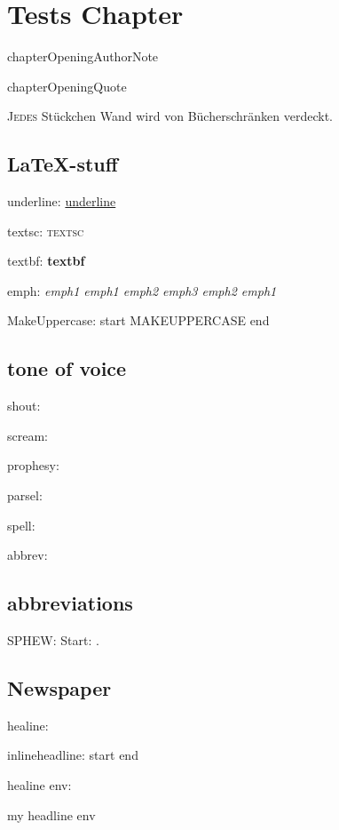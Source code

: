 \chapter{Tests Chapter}

\begin{chapterOpeningAuthorNote}
chapterOpeningAuthorNote
\end{chapterOpeningAuthorNote}
\begin{chapterOpeningQuote}
chapterOpeningQuote
\end{chapterOpeningQuote}

\lettrine{J}{edes} Stückchen Wand wird von Bücherschränken verdeckt.

\section{\LaTeX-stuff}
underline: \underline{underline}

textsc: \textsc{textsc}

textbf: \textbf{textbf}

emph: \emph{emph1 emph1 \emph{emph2 \emph{emph3} emph2} emph1}

MakeUppercase: start \MakeUppercase{MakeUppercase} end

\section{tone of voice}

shout: 

scream: 

prophesy: 

parsel: 

spell: 

abbrev: 

\section{abbreviations}
SPHEW: Start: \SPHEW.

\section{Newspaper}

healine: 

inlineheadline: start  end

healine env:
\begin{headlines}
my headline env
\end{headlines}

